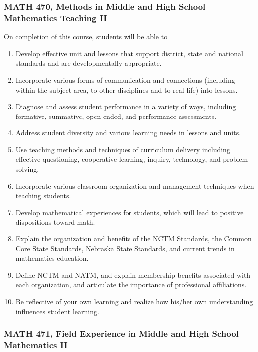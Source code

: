 \documentclass[11pt]{article}
\newenvironment{alphalist}{
\begin{enumerate}[label=(\arabic*),widest=107 ,leftmargin=25pt, itemsep=0pt]}
{\end{enumerate}}
\begin{document}
\subsubsection*{MATH 470, Methods in Middle and High School Mathematics Teaching II}

On completion of this course, students will be able to
\begin{alphalist}
\item Develop effective unit and lessons that support district, state and national standards and are developmentally appropriate.
\item Incorporate various forms of communication and connections (including within the subject area, to other disciplines and to real life) into lessons.
\item Diagnose and assess student performance in a variety of ways, including formative, summative, open ended, and performance assessments.
\item Address student diversity and various learning needs in lessons and units.
\item Use teaching methods and techniques of curriculum delivery including effective questioning, cooperative learning, inquiry, technology, and problem solving.
\item Incorporate various classroom organization and management techniques when teaching students.
\item Develop mathematical experiences for students, which will lead to positive dispositions toward math.
 \item Explain the organization and benefits of the NCTM Standards, the Common Core State Standards, Nebraska State Standards, and current trends in mathematics education.
\item Define NCTM and NATM, and explain membership benefits associated with each organization, and articulate the importance of professional affiliations.
\item Be reflective of your own learning and realize how his/her own understanding influences student learning.
\end{alphalist}

\subsubsection*{MATH 471, Field Experience in Middle and High School Mathematics II}
\end{document}
